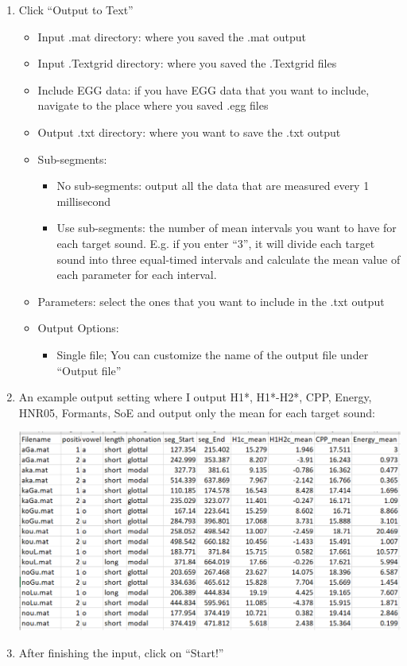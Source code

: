 \documentclass[
]{article}
\providecommand{\tightlist}{%
  \setlength{\itemsep}{0pt}\setlength{\parskip}{0pt}}
\begin{document}
\begin{enumerate}
\def\labelenumi{\arabic{enumi}.}
\tightlist
\item
  Click ``Output to Text''

  \begin{itemize}
  \tightlist
  \item
    Input .mat directory: where you saved the .mat output
  \item
    Input .Textgrid directory: where you saved the .Textgrid files
  \item
    Include EGG data: if you have EGG data that you want to include,
    navigate to the place where you saved .egg files
  \item
    Output .txt directory: where you want to save the .txt output
  \item
    Sub-segments:

    \begin{itemize}
    \tightlist
    \item
      No sub-segments: output all the data that are measured every 1
      millisecond
    \item
      Use sub-segments: the number of mean intervals you want to have
      for each target sound. E.g. if you enter ``3'', it will divide
      each target sound into three equal-timed intervals and calculate
      the mean value of each parameter for each interval.
    \end{itemize}
  \item
    Parameters: select the ones that you want to include in the .txt
    output
  \item
    Output Options:

    \begin{itemize}
    \tightlist
    \item
      Single file; You can customize the name of the output file under
      ``Output file''
    \end{itemize}
  \end{itemize}
\item
  An example output setting where I output H1*, H1*-H2*, CPP, Energy,
  HNR05, Formants, SoE and output only the mean for each target sound:

  \includegraphics[width=1\textwidth,height=\textheight]{image/vs_outputtext.png}
\item
  After finishing the input, click on ``Start!''
\end{enumerate}
\end{document}
